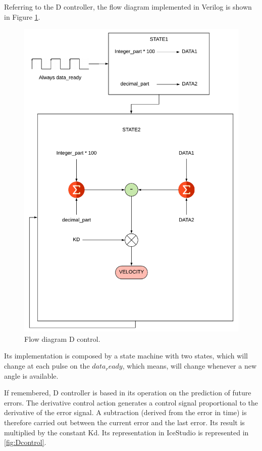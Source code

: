 Referring to the D controller, the flow diagram implemented in Verilog is shown in Figure \ref{fig:D_control}. 
	\begin{figure}[H]
	\center
	\includegraphics[trim = 0cm 0cm 0mm 0cm, clip,scale=0.4]{imagenes/Balancing_robot/D.pdf}
	\caption{Flow diagram D control.}
	\label{fig:D_control}
\end{figure}

Its implementation is composed by a state machine with two states, which will change at each pulse on the $data_ready$, which means, will change whenever a new angle is available.\newline

If remembered, D controller is based in its operation on the prediction of future errors. The derivative control action generates a control signal proportional to the derivative of the error signal. \newline
A subtraction (derived from the error in time) is therefore carried out between the current error and the last error. Its result is multiplied by the constant Kd. Its representation in IceStudio is represented in \ref{fig:Dcontrol}.

